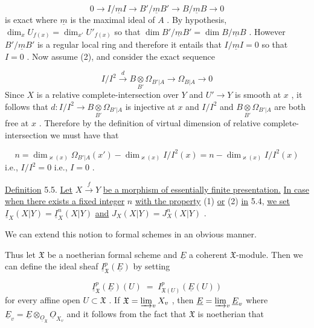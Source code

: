 \begin{equation*}
0 \to I/\underline{m}I \to B'/\underline{m}B' \to B/\underline{m}B \to 0
\end{equation*}
is exact where $\underline{m}$ is the maximal ideal of $A$ . By hypothesis, $\dim_{x}U_{f(x)} = \dim_{x'}U'_{f(x)}$ so that $\dim B'/\underline{m}B' = \dim B/\underline{m}B$ . However $B'/\underline{m}B'$ is a regular local ring and therefore it entails that $I/\underline{m}I = 0$ so that $I = 0$ . Now assume (2), and consider the exact sequence

\begin{equation*}
I/I^{2} \overset{d}{\to} B \underset{B'}{\otimes} \Omega_{B'|A} \to \Omega_{B|A} \to 0
\end{equation*}
Since $X$ is a relative complete-intersection over $Y$ and $U' \to Y$ is smooth at $x$ , it follows that $d : I/I^{2} \to B \underset{B'}{\otimes} \Omega_{B'|A}$ is injective at $x$ and $I/I^{2}$ and $B \underset{B'}{\otimes} \Omega_{B'|A}$ are both free at $x$ . Therefore by the definition of virtual dimension of relative complete-intersection we must have that

\begin{equation*}
n = \dim_{\varkappa(x)}\Omega_{B'|A}(x') - \dim_{\varkappa(x)}I/I^{2}(x) = n - \dim_{\varkappa(x)}I/I^{2}(x)
\end{equation*}
i.e., $I/I^{2} = 0$ i.e., $I = 0$ .

\underline{Definition} 5.5.   \underline{Let} $X \overset{f}{\to} Y$ \underline{be a morphism of essentially finite presentation.} \underline{In case when there exists a fixed integer} $n$ \underline{with the property} (1) \underline{or} (2) \underline{in} 5.4,
\underline{we set}  $\underline{I}_X(X|Y) = \underline{I}^n_X(X|Y)$  \underline{and}  $J_X(X|Y) = J^n_X(X|Y)$ .

We can extend this notion to formal schemes in an obvious manner.

Thus let $\mathfrak{X}$ be a noetherian formal scheme and $\underline{E}$ a coherent $\mathfrak{X}$-module. Then we can define the ideal sheaf $\underline{I}^p_{\mathfrak{X}}(\underline{E})$ by setting

\begin{equation*}
\underline{I}^p_{\mathfrak{X}}(\underline{E})(U) \;=\; I^p_{\mathfrak{X}(U)}(\underline{E}(U))
\end{equation*}
for every affine open $U \subset \mathfrak{X}$ . If $\mathfrak{X} = \varinjlim_{v} X_v$ , then $\underline{E} = \varinjlim_{v} \underline{E}_v$ where $\underline{E}_v = \underline{E} \otimes_{\underline{O}_{\mathfrak{X}}} \underline{O}_{X_v}$ and it follows from the fact that $\mathfrak{X}$ is noetherian that

